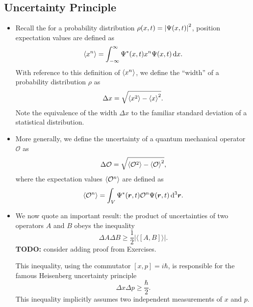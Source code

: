 \documentclass[11pt, a4paper]{article}
\newcommand{\diff}{\mathop{}\!\mathrm{d}} %
\newcommand{\dr}{\diff^{3} \r}  %
\renewcommand{\vec}[1]{\bm{#1}}  %
\renewcommand{\r}{\vec{r}}  %
\renewcommand{\O}{\mathcal{O}}  %
\renewcommand{\P}{\Psi}  %
\newcommand{\evb}[1]{\big \langle {#1} \big \rangle}  %
\begin{document}
\subsection{Uncertainty Principle}
\begin{itemize}
	\item Recall the for a probability distribution $ \rho(x, t) = \abs{\P(x, t)}^{2} $, position expectation values are defined as
	\begin{equation*}
		\ev{x^{n}} = \int_{-\infty}^{\infty} \P^{*}(x, t) x^{n} \P(x, t) \diff x.
	\end{equation*}
	With reference to this definition of $ \ev{x^{n}} $, we define the ``width'' of a probability distribution $ \rho $ as
	\begin{equation*}
		\Delta x = \sqrt{\ev{x^{2}} - \ev{x}^{2}}.
	\end{equation*}
	Note the equivalence of the width $ \Delta x $ to the familiar standard deviation of a statistical distribution. 
	
	\item More generally, we define the uncertainty of a quantum mechanical operator $ \O $ as
	\begin{equation*}
		\Delta \O = \sqrt{\ev{\O^{2}} - \ev{\O}^{2}},
	\end{equation*}
	where the expectation values $ \ev{\O^{n}} $ are defined as
	\begin{equation*}
		\ev{\O^{n}} = \int_{V} \P^{*}(\r, t) \O^{n} \P(\r, t) \dr.
	\end{equation*}
	
	\item We now quote an important result: the product of uncertainties of two operators $ A $ and $ B $ obeys the inequality
	\begin{equation*}
		\Delta A \Delta B \geq \frac{1}{2} \big | \evb{[A, B]} \big |.
	\end{equation*} 
	\textbf{TODO:} consider adding proof from Exercises.
	
	This inequality, using the commutator $ [x, p] = i \hbar $, is responsible for the famous Heisenberg uncertainty principle
	\begin{equation*}
		\Delta x \Delta p \geq \frac{\hbar}{2}.
	\end{equation*}
	This inequality implicitly assumes two independent measurements of $ x $ and $ p $.
	
\end{itemize}
\end{document}
